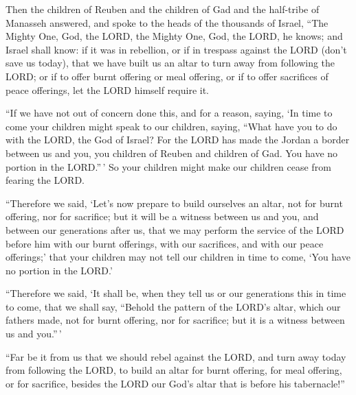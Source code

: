  Then the children of Reuben and the children of Gad and
the half-tribe of Manasseh answered, and spoke to the heads of the
thousands of Israel,  ``The Mighty One, God, the LORD,
the Mighty One, God, the LORD, he knows; and Israel shall know: if it
was in rebellion, or if in trespass against the LORD (don't save us
today),  that we have built us an altar to turn away from
following the LORD; or if to offer burnt offering or meal offering, or
if to offer sacrifices of peace offerings, let the LORD himself require
it.

 ``If we have not out of concern done this, and for a
reason, saying, `In time to come your children might speak to our
children, saying, ``What have you to do with the LORD, the God of
Israel?  For the LORD has made the Jordan a border
between us and you, you children of Reuben and children of Gad. You have
no portion in the LORD.''\,' So your children might make our children
cease from fearing the LORD.

 ``Therefore we said, `Let's now prepare to build
ourselves an altar, not for burnt offering, nor for sacrifice;
 but it will be a witness between us and you, and between
our generations after us, that we may perform the service of the LORD
before him with our burnt offerings, with our sacrifices, and with our
peace offerings;' that your children may not tell our children in time
to come, `You have no portion in the LORD.'

 ``Therefore we said, `It shall be, when they tell us or
our generations this in time to come, that we shall say, ``Behold the
pattern of the LORD's altar, which our fathers made, not for burnt
offering, nor for sacrifice; but it is a witness between us and
you.''\,'

 ``Far be it from us that we should rebel against the
LORD, and turn away today from following the LORD, to build an altar for
burnt offering, for meal offering, or for sacrifice, besides the LORD
our God's altar that is before his tabernacle!''

